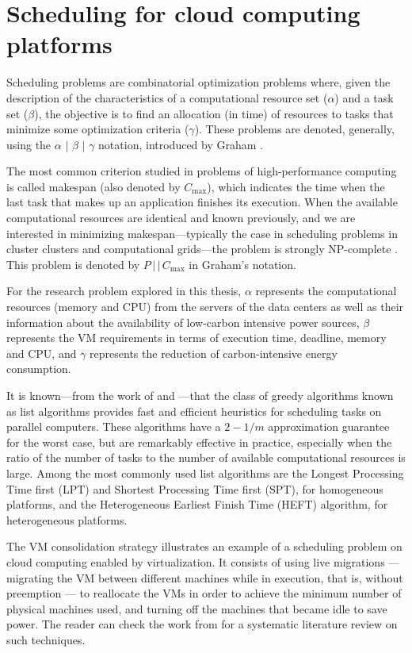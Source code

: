 \section{Scheduling for cloud computing platforms}
\label{sec:scheduling_cloud}

Scheduling problems are combinatorial optimization problems where, given the description of the characteristics of a computational resource set ($\alpha$) and a task set ($\beta$), the objective is to find an allocation (in time) of resources to tasks that minimize some optimization criteria ($\gamma$). These problems are denoted, generally, using the $\alpha$ $\vert$ $\beta$ $\vert$ $\gamma$ notation, introduced by Graham \citep{graham}. 

The most common criterion studied in problems of high-performance computing is called makespan (also denoted by $C_{\max}$), which indicates the time when the last task that makes up an application finishes its execution. When the available computational resources are identical and known previously, and we are interested in minimizing makespan---typically the case in scheduling problems in cluster clusters and computational grids---the problem is strongly NP-complete \citep{Garey}. This problem is denoted by $P\,\vert\,\vert\,C_{\max}$ in Graham's notation.

For the research problem explored in this thesis, $\alpha$ represents the computational resources (memory and CPU) from the servers of the data centers as well as their information about the availability of low-carbon intensive power sources, $\beta$ represents the VM requirements in terms of execution time,  deadline, memory and CPU, and $\gamma$ represents the reduction of carbon-intensive energy consumption.

It is known---from the work of \citet {graham} and \citet {Garey}---that the class of greedy algorithms known as list algorithms provides fast and efficient heuristics for scheduling tasks on parallel computers. These algorithms have a $2 -1 /m$ approximation guarantee for the worst case, but are remarkably effective in practice, especially when the ratio of the number of tasks to the number of available computational resources is large. Among the most commonly used list algorithms are the Longest Processing Time first (LPT) and Shortest Processing Time first (SPT),  for homogeneous platforms, and the Heterogeneous Earliest Finish Time (HEFT) algorithm, for heterogeneous platforms.

The VM consolidation strategy illustrates an example of a scheduling problem on cloud computing enabled by virtualization. It consists of using live migrations --- migrating the VM between different machines while in execution, that is, without preemption --- to reallocate the VMs in order to achieve the minimum number of physical machines used, and turning off the machines that became idle to save power. The reader can check the work from \citet{10.1145/3470972} for a systematic literature review on such techniques.



